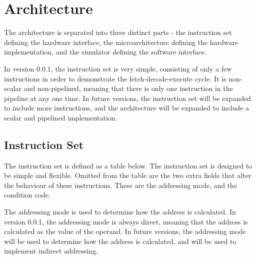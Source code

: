\documentclass[a4paper,11pt]{article}
\begin{document}
\section{Architecture}
\label{sec:Architecture}

The architecture is separated into three distinct parts - the instruction set defining the hardware interface, the microarchitecture defining the hardware implementation, and the simulator defining the software interface.

In version 0.0.1, the instruction set is very simple, consisting of only a few instructions in order to demonstrate the fetch-decode-execute cycle. It is non-scalar and non-pipelined, meaning that there is only one instruction in the pipeline at any one time. In future versions, the instruction set will be expanded to include more instructions, and the architecture will be expanded to include a scalar and pipelined implementation.

\subsection{Instruction Set}
\label{subsec:Instruction Set}

The instruction set is defined as a table below. The instruction set is designed to be simple and flexible. Omitted from the table are the two extra fields that alter the behaviour of these instructions. These are the addressing mode, and the condition code.

The addressing mode is used to determine how the address is calculated. In version 0.0.1, the addressing mode is always direct, meaning that the address is calculated as the value of the operand. In future versions, the addressing mode will be used to determine how the address is calculated, and will be used to implement indirect addressing.
\end{document}
